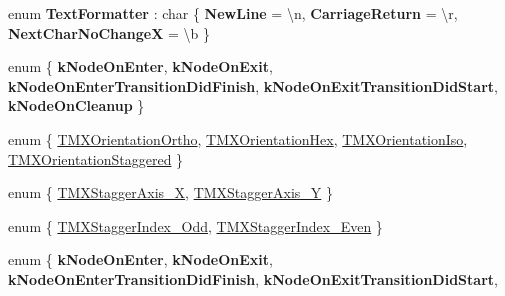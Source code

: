 \begin{DoxyCompactItemize}
\item 
\mbox{\label{group____2d_ga9225b19be8532afc1a22a4df07fd5e16}} 
enum {\bfseries Text\+Formatter} \+: char \{ {\bfseries New\+Line} = \textquotesingle{}\textbackslash{}n\textquotesingle{}, 
{\bfseries Carriage\+Return} = \textquotesingle{}\textbackslash{}r\textquotesingle{}, 
{\bfseries Next\+Char\+No\+ChangeX} = \textquotesingle{}\textbackslash{}b\textquotesingle{}
 \}
\item 
\mbox{\label{group____2d_gabed82baf7f470b522273a3e37c24c600}} 
enum \{ \newline
{\bfseries k\+Node\+On\+Enter}, 
{\bfseries k\+Node\+On\+Exit}, 
{\bfseries k\+Node\+On\+Enter\+Transition\+Did\+Finish}, 
{\bfseries k\+Node\+On\+Exit\+Transition\+Did\+Start}, 
\newline
{\bfseries k\+Node\+On\+Cleanup}
 \}
\item 
enum \{ \hyperlink{group____2d_ggaba01db17f4a2bfbc3db60dc172972a25a6e605dfb7c2c2feae0c28597a7e5bf33}{T\+M\+X\+Orientation\+Ortho}, 
\hyperlink{group____2d_ggaba01db17f4a2bfbc3db60dc172972a25abc4f9eb49e1e2819fbd0009bb0748652}{T\+M\+X\+Orientation\+Hex}, 
\hyperlink{group____2d_ggaba01db17f4a2bfbc3db60dc172972a25a0584ce842cf448823601c495b428302a}{T\+M\+X\+Orientation\+Iso}, 
\hyperlink{group____2d_ggaba01db17f4a2bfbc3db60dc172972a25a7bc6f3f47d73bb8d55469314412d2c8f}{T\+M\+X\+Orientation\+Staggered}
 \}
\item 
enum \{ \hyperlink{group____2d_ggaaf105ae5beaca1dee30ae54530691fcea144f1dacc945aeaed93bfa0c97febaad}{T\+M\+X\+Stagger\+Axis\+\_\+X}, 
\hyperlink{group____2d_ggaaf105ae5beaca1dee30ae54530691fcea0e2dd404e5125c2bbd4ddf90827beca4}{T\+M\+X\+Stagger\+Axis\+\_\+Y}
 \}
\item 
enum \{ \hyperlink{group____2d_gga80155586fa275b28773c9b203f52cabaa5a499a035916d3408262fe103cc830a2}{T\+M\+X\+Stagger\+Index\+\_\+\+Odd}, 
\hyperlink{group____2d_gga80155586fa275b28773c9b203f52cabaa3943e33b77c96b43bf6bc2f9ca0b2120}{T\+M\+X\+Stagger\+Index\+\_\+\+Even}
 \}
\item 
\mbox{\label{group____2d_ga6fde86696b9fb4575b16ddc150ff0a84}} 
enum \{ \newline
{\bfseries k\+Node\+On\+Enter}, 
{\bfseries k\+Node\+On\+Exit}, 
{\bfseries k\+Node\+On\+Enter\+Transition\+Did\+Finish}, 
{\bfseries k\+Node\+On\+Exit\+Transition\+Did\+Start}, 

\end{DoxyCompactItemize}
